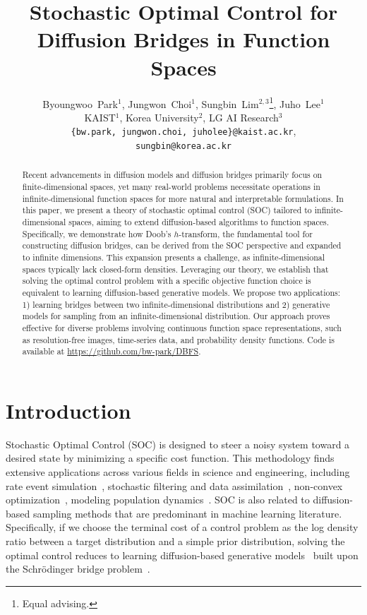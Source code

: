 \documentclass[nohyperref]{article}
\title{Stochastic Optimal Control for Diffusion Bridges in Function Spaces}
\author{
    Byoungwoo~Park$^{1}$,
    Jungwon~Choi$^{1}$,
    Sungbin~Lim$^{2, 3}$\thanks{Equal advising.},
    Juho~Lee$^{1}$\footnotemark[1] \\
    KAIST$^1$, Korea University$^2$, LG AI Research$^3$ \\
    \texttt{\{bw.park,\,jungwon.choi,\,juholee\}@kaist.ac.kr}, \\ \texttt{sungbin@korea.ac.kr}
    }
\theoremstyle{plain}
\theoremstyle{remark}
\begin{document}
\maketitle


\begin{abstract}

Recent advancements in diffusion models and diffusion bridges primarily focus on finite-dimensional spaces, yet many real-world problems necessitate operations in infinite-dimensional function spaces for more natural and interpretable formulations. 
In this paper, we present a theory of stochastic optimal control (SOC) tailored to infinite-dimensional spaces, aiming to extend diffusion-based algorithms to function spaces. 
Specifically, we demonstrate how Doob’s $h$-transform, the fundamental tool for constructing diffusion bridges, can be derived from the SOC perspective and expanded to infinite dimensions. 
This expansion presents a challenge, as infinite-dimensional spaces typically lack closed-form densities. 
Leveraging our theory, we establish that solving the optimal control problem with a specific objective function choice is equivalent to learning diffusion-based generative models. 
We propose two applications: 1) learning bridges between two infinite-dimensional distributions and 2) generative models for sampling from an infinite-dimensional distribution. 
Our approach proves effective for diverse problems involving continuous function space representations, such as resolution-free images, time-series data, and probability density functions. Code is available at
\url{https://github.com/bw-park/DBFS}.

\end{abstract}

\section{Introduction}
Stochastic Optimal Control (SOC) is designed to steer a noisy system toward a desired state by minimizing a specific cost function. This methodology finds extensive applications across various fields in science and engineering, including rate event simulation~\citep{hartmann2019variational, holdijk2022path}, stochastic filtering and data assimilation~\citep{506400, van2007stochastic, reich2019data}, non-convex optimization~\citep{chaudhari2018deep}, modeling population dynamics~\citep{carmona2018probabilistic, liu2022deep}. SOC is also related to diffusion-based sampling methods that are predominant in machine learning literature. Specifically, if we choose the terminal cost of a control problem as the log density ratio between a target distribution and a simple prior distribution, solving the optimal control reduces to learning diffusion-based generative models~\citep{richter2021solving, zhang2022path, vargas2023bayesian} built upon the Schrödinger bridge problem~\citep{Pra1991ASC, chen2020stochastic}. 
\end{document}
